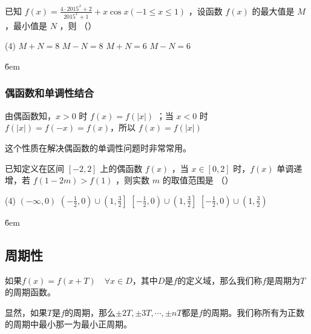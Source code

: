 \begin{example}
    已知 $f(x)=\frac{4 \cdot 2015^x+2}{2015^x+1}+x \cos x(-1 \leq x \leq 1)$ ，设函数 $f(x)$ 的最大值是 $M$ ，最小值是 $N$ ，则 （\qquad）
    \begin{tasks}(4)
        \task $M+N=8$
        \task $M-N=8$
        \task $M+N=6$
        \task $M-N=6$
    \end{tasks}
\end{example}

\v{6em}

\subsubsection{偶函数和单调性结合}

\begin{theorem}[偶函数和单调性结合]
    由偶函数知，$x>0$ 时 $f(x)=f(|x|)$ ；当 $x<0$ 时 $f(|x|)=f(-x)=f(x)$，所以 $f(x) = f(|x|)$
\end{theorem}

\begin{tips}
    这个性质在解决偶函数的单调性问题时非常常用。
\end{tips}

\begin{example}
    已知定义在区间 $[-2,2]$ 上的偶函数 $f(x)$ ，当 $x \in[0,2]$ 时，$f(x)$ 单调递增，若 $f(1-2 m)>f(1)$ ，则实数 $m$ 的取值范围是 （\qquad）
    \begin{tasks}(4)
        \task $(-\infty, 0)$
        \task $\left(-\frac{1}{2}, 0\right) \cup\left(1, \frac{3}{2}\right]$
            \task $\left[-\frac{1}{2}, 0\right) \cup\left(1, \frac{3}{2}\right]$
            \task $\left[-\frac{1}{2}, 0\right) \cup\left(1, \frac{3}{2}\right)$
    \end{tasks}
\end{example}

\v{6em}

\subsection{周期性}

\begin{definition}[周期性]
    如果$f(x)=f(x+T)\quad \forall x\in D$，其中$D$是$f$的定义域，那么我们称$f$是周期为$T$的周期函数。
\end{definition}

\begin{definition}[最小正周期]
    显然，如果$T$是$f$的周期，那么$\pm2T,\pm3T,\cdots,\pm nT$都是$f$的周期。我们称所有为正数的周期中最小那一为最小正周期。
\end{definition}

